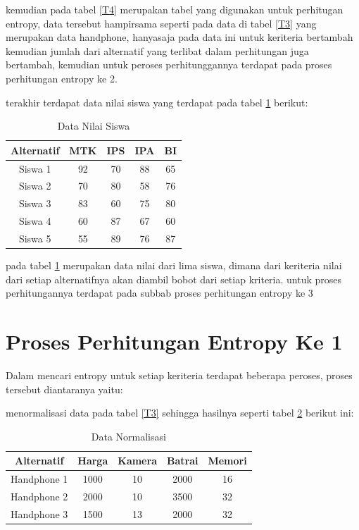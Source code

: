 kemudian pada tabel \ref{T4} merupakan tabel yang digunakan untuk perhitugan entropy, data tersebut hampirsama seperti pada data di tabel \ref{T3} yang merupakan data handphone, hanyasaja pada data ini untuk keriteria bertambah kemudian jumlah dari alternatif yang terlibat dalam perhitungan juga bertambah, kemudian untuk peroses perhitunggannya terdapat pada proses perhitungan entropy ke 2.\par
\pagebreak
terakhir terdapat data nilai siswa yang terdapat pada tabel \ref{T5} berikut:

\begin{table}[h]
\caption{Data Nilai Siswa}
\centering
\begin{tabular}{|c|c|c|c|c|}
\hline
Alternatif & MTK & IPS & IPA&BI\\
\hline
Siswa 1 &92 & 70 & 88 &  65\\
\hline
Siswa 2 &70 & 80 & 58 &  76\\
\hline
Siswa 3 &83 & 60 & 75 &  80\\
\hline
Siswa 4 &60 & 87 & 67 &  60\\
\hline
Siswa 5 &55 & 89 & 76 &  87\\
\hline

\end{tabular}
\label{T5}
\end{table}

pada tabel \ref{T5} merupakan data nilai dari lima siswa, dimana dari keriteria nilai dari setiap alternatifnya akan diambil bobot dari setiap kriteria. untuk proses perhitungannya terdapat pada subbab proses perhitungan entropy ke 3

\section{Proses Perhitungan Entropy Ke 1}

	Dalam mencari entropy untuk setiap keriteria terdapat beberapa peroses, proses tersebut diantaranya yaitu:

menormalisasi data pada tabel \ref{T3} sehingga hasilnya seperti tabel \ref{table4} berikut ini:
\begin{table}[h]
\caption{Data Normalisasi}
\centering
\begin{tabular}{|c|c|c|c|c|}
\hline
Alternatif & Harga & Kamera & Batrai&Memori\\
\hline
Handphone 1 &1000 & 10 & 2000 &  16\\
\hline
Handphone 2 &2000 & 10 & 3500 &  32\\
\hline
Handphone 3 &1500 & 13 & 2000 &  32\\
\hline

\end{tabular}
\label{table4}
\end{table}

